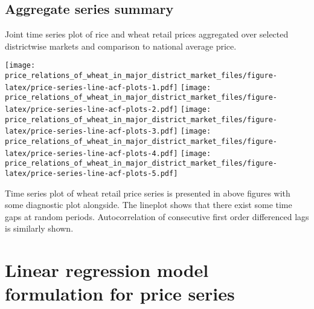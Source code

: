 \documentclass[
  12pt,
]{article}
\begin{document}
\hypertarget{aggregate-series-summary}{%
\subsection{Aggregate series summary}\label{aggregate-series-summary}}

Joint time series plot of rice and wheat retail prices aggregated over selected districtwise markets and comparison to national average price.

\texttt{[image: price\_relations\_of\_wheat\_in\_major\_district\_market\_files/figure-latex/price-series-line-acf-plots-1.pdf]} \texttt{[image: price\_relations\_of\_wheat\_in\_major\_district\_market\_files/figure-latex/price-series-line-acf-plots-2.pdf]} \texttt{[image: price\_relations\_of\_wheat\_in\_major\_district\_market\_files/figure-latex/price-series-line-acf-plots-3.pdf]} \texttt{[image: price\_relations\_of\_wheat\_in\_major\_district\_market\_files/figure-latex/price-series-line-acf-plots-4.pdf]} \texttt{[image: price\_relations\_of\_wheat\_in\_major\_district\_market\_files/figure-latex/price-series-line-acf-plots-5.pdf]}

Time series plot of wheat retail price series is presented in above figures with some diagnostic plot alongside. The lineplot shows that there exist some time gaps at random periods. Autocorrelation of consecutive first order differenced lags is similarly shown.

\hypertarget{linear-regression-model-formulation-for-price-series}{%
\section{Linear regression model formulation for price series}\label{linear-regression-model-formulation-for-price-series}}
\end{document}
